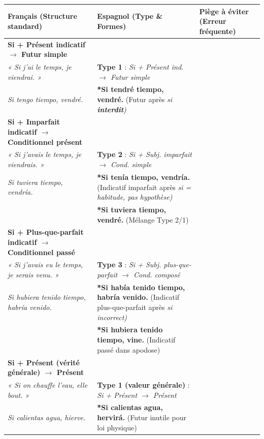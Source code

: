 \documentclass[11pt]{article}
\newcommand{\esp}[1]{\ifmmode\text{\textit{#1}}\else\begingroup\selectlanguage{spanish}\itshape #1\endgroup\fi}
\begin{document}
\begin{center}
\begin{tabularx}{\linewidth}{|>{\raggedright\arraybackslash}X|>{\centering\arraybackslash}X|>{\raggedright\arraybackslash}X|}
\hline
\rowcolor{popblue}
\textbf{Français (Structure standard)} & \textbf{Espagnol (Type \& Formes)} & \textbf{Piège à éviter (Erreur fréquente)} \\
\hline
\textbf{Si + Présent indicatif $\rightarrow$ Futur simple} \\
\emph{« Si j'ai le temps, je viendrai. »} & \textbf{Type 1} : \esp{Si + Présent ind. $\rightarrow$ Futur simple} \\
\esp{Si tengo tiempo, vendré.} & \textcolor{popdark}{\textbf{*Si tendré tiempo, vendré.}} (Futur après \esp{si} \textbf{interdit}) \\
\hline
\textbf{Si + Imparfait indicatif $\rightarrow$ Conditionnel présent} \\
\emph{« Si j'avais le temps, je viendrais. »} & \textbf{Type 2} : \esp{Si + Subj. imparfait $\rightarrow$ Cond. simple} \\
\esp{Si tuviera tiempo, vendría.} & \textcolor{popdark}{\textbf{*Si tenía tiempo, vendría.}} (Indicatif imparfait après \esp{si} = habitude, pas hypothèse) \\
& \textcolor{popdark}{\textbf{*Si tuviera tiempo, vendré.}} (Mélange Type 2/1) \\
\hline
\textbf{Si + Plus-que-parfait indicatif $\rightarrow$ Conditionnel passé} \\
\emph{« Si j'avais eu le temps, je serais venu. »} & \textbf{Type 3} : \esp{Si + Subj. plus-que-parfait $\rightarrow$ Cond. composé} \\
\esp{Si hubiera tenido tiempo, habría venido.} & \textcolor{popdark}{\textbf{*Si había tenido tiempo, habría venido.}} (Indicatif plus-que-parfait après \esp{si} incorrect) \\
& \textcolor{popdark}{\textbf{*Si hubiera tenido tiempo, vine.}} (Indicatif passé dans apodose) \\
\hline
\textbf{Si + Présent (vérité générale) $\rightarrow$ Présent} \\
\emph{« Si on chauffe l'eau, elle bout. »} & \textbf{Type 1 (valeur générale)} : \esp{Si + Présent $\rightarrow$ Présent} \\
\esp{Si calientas agua, hierve.} & \textcolor{popdark}{\textbf{*Si calientas agua, hervirá.}} (Futur inutile pour loi physique) \\
\hline
\end{tabularx}
\end{center}
\end{document}
